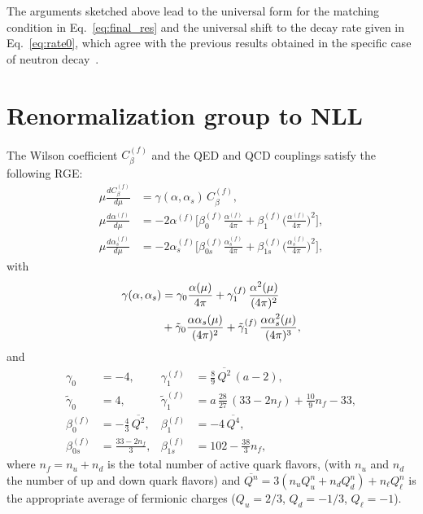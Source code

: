 \documentclass[prl,twocolumn,twoside,preprintnumbers,superscriptaddress,nofootinbib,letterpaper]{revtex4-1}
\begin{document}
The arguments sketched above lead to the  universal form for the matching condition in Eq.~\eqref{eq:final_res}
and  the universal shift to the decay rate given in  Eq.~\eqref{eq:rate0},
which agree with the previous results obtained in the specific case of neutron decay~\cite{Cirigliano:2022hob,Cirigliano:2023fnz,Gorbahn:2025ssv}.




\section{Renormalization group to NLL}
\label{app:RGE}


The Wilson coefficient  $C_\beta^{(f)}$ and  the QED and QCD couplings satisfy the following
RGE:
\begin{align}
\mu \frac{d C^{(f)}_\beta}{d \mu} & = \gamma (\alpha, \alpha_s) \, C^{(f)}_\beta,
\nonumber \\
\mu \frac{d \alpha^{(f)}}{d \mu} & = - 2 \alpha^{(f)} \bigg[ \beta^{(f)}_0 \frac{\alpha^{(f)}}{4 \pi}  + \beta^{(f)}_1 \bigg( \frac{\alpha^{(f)}}{4 \pi} \bigg)^2
\bigg],
\nonumber \\
\mu \frac{d \alpha^{(f)}_s  }{d \mu} & = - 2 \alpha^{(f)}_s \bigg[\beta^{(f)}_{0s} \frac{\alpha^{(f)}_s}{4 \pi}  + \beta^{(f)}_{1s} \bigg( \frac{\alpha^{(f)}_s}{4 \pi} \bigg)^2
\bigg],
\end{align}
with~\cite{Sirlin:1981ie,Buras:1989xd,Cirigliano:2023fnz,Gorbahn:2025ssv}
\begin{align}
\gamma (\alpha, \alpha_s)   &=  \gamma_0  \frac{\alpha (\mu) }{4 \pi}  + \gamma_{1}^{(f)}  \, \frac{\alpha^2 (\mu)}{(4 \pi)^2}\notag\\
&+\tilde \gamma_0
\frac{\alpha \alpha_s (\mu)}{(4 \pi)^2}  + \tilde \gamma_{1}^{(f)}  \, \frac{\alpha \alpha_s^2 (\mu)}{(4 \pi)^3},
\end{align}
and
\begin{align}
\gamma_0 &=  - 4, &
\gamma_1^{(f)} &= \frac{8}{9} \, \overline{Q^2} \, (a - 2),
\nonumber \\
\tilde \gamma_0 &=  4, &
\tilde \gamma_1^{(f)} &=  a \, \frac{28}{27} \, (33 - 2 n_f)  + \frac{10}{9} n_f - 33,
\nonumber \\
\beta_0^{(f)} &= - \frac{4}{3} \, \overline{Q^2},&
\beta_1^{(f)} &= - 4 \,  \overline{Q^4},
\nonumber \\
\beta_{0s}^{(f)} &= \frac{33 - 2 n_f}{3},&
\beta_{1s}^{(f)} &= 102 - \frac{38}{3} n_f,
\end{align}
where $n_f = n_u + n_d$ is the total number of active quark flavors,
(with $n_u$ and $n_d$ the number of up and down quark flavors)
and   $\overline{Q^n} = 3 (n_u Q_u^n + n_d Q_d^n) + n_\ell Q_\ell^n$
is the appropriate average of fermionic charges
($Q_u = 2/3$, $Q_d = -1/3$,  $Q_\ell = -1$).
\end{document}
